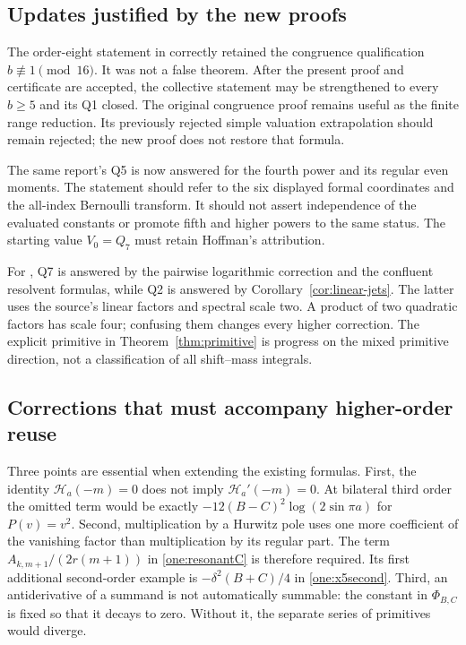 \documentclass[11pt,a4paper]{article}
\numberwithin{equation}{section}
\theoremstyle{plain}
\theoremstyle{definition}
\theoremstyle{remark}
\begin{document}
\subsection{Updates justified by the new proofs}

The order-eight statement in \cite{Reconstruction} correctly retained
the congruence qualification $b\not\equiv1\pmod{16}$.  It was not a
false theorem.  After the present proof and certificate are accepted,
the collective statement may be strengthened to every $b\ge5$ and its
Q1 closed.  The original congruence proof remains useful as the finite
range reduction.  Its previously rejected simple valuation extrapolation
should remain rejected; the new proof does not restore that formula.

The same report's Q5 is now answered for the fourth power and its
regular even moments.  The statement should refer to the six displayed
formal coordinates and the all-index Bernoulli transform.  It should
not assert independence of the evaluated constants or promote fifth
and higher powers to the same status.  The starting value $V_0=Q_7$
must retain Hoffman's attribution.

For \cite{Quadratic}, Q7 is answered by the pairwise logarithmic
correction and the confluent resolvent formulas, while Q2 is answered
by Corollary~\ref{cor:linear-jets}.  The latter uses the source's
linear factors and spectral scale two.  A product of two quadratic
factors has scale four; confusing them changes every higher correction.
The explicit primitive in Theorem~\ref{thm:primitive} is progress on
the mixed primitive direction, not a classification of all shift--mass
integrals.

\subsection{Corrections that must accompany higher-order reuse}

Three points are essential when extending the existing formulas.
First, the identity $\mathcal H_a(-m)=0$ does not imply
$\mathcal H_a'(-m)=0$.  At bilateral third order the omitted term
would be exactly $-12(B-C)^2\log(2\sin\pi a)$ for $P(v)=v^2$.
Second, multiplication by a Hurwitz pole uses one more coefficient
of the vanishing factor than multiplication by its regular part.
The term $A_{k,m+1}/(2r(m+1))$ in
\eqref{one:resonantC} is therefore required.  Its first additional
second-order example is $-\delta^2(B+C)/4$ in
\eqref{one:x5second}.  Third, an antiderivative of a summand is not
automatically summable: the constant in $\Phi_{B,C}$ is fixed so
that it decays to zero.  Without it, the separate series of primitives
would diverge.
\end{document}
